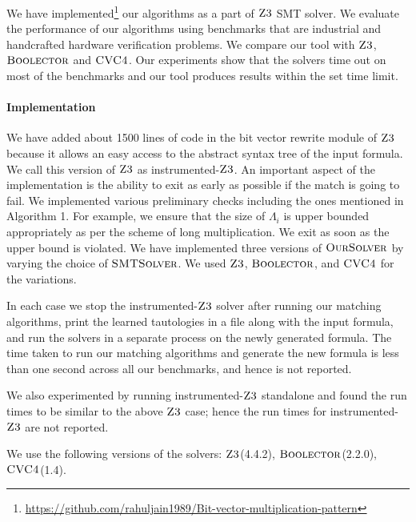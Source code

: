 %
We have implemented\footnote{\url{https://github.com/rahuljain1989/Bit-vector-multiplication-pattern}} our algorithms as a part of $\textsc{Z3}$ SMT solver.
%
 We evaluate the performance of our algorithms using benchmarks that are industrial and handcrafted hardware verification problems.
%
We compare our tool with $\textsc{Z3}$, $\textsc{Boolector}$ and $\textsc{CVC4}$.
%
Our experiments show that the solvers time out on most of the benchmarks and our tool produces results within the set time limit.

\paragraph{\bf Implementation}
We have added about 1500 lines of code in the bit vector rewrite module of $\textsc{Z3}$ because it allows an easy access to the abstract syntax tree of the input formula. We call this version of $\textsc{Z3}$ as instrumented-$\textsc{Z3}$.
%
An important aspect of the implementation is the ability to exit as early as possible if the match is going to fail.
%
We implemented various preliminary checks including the ones mentioned in Algorithm 1. For example, we ensure that the size of $\Lambda_i$ is upper bounded appropriately as per the scheme of long multiplication. We exit as soon as the upper bound is violated. 
%
We have implemented three versions of $\textsc{OurSolver}$ by varying the choice of $\textsc{SMTSolver}$.
%
We used  $\textsc{Z3}$, $\textsc{Boolector}$, and $\textsc{CVC4}$ for the variations. 
%

In each case we stop the instrumented-$\textsc{Z3}$ solver after running our matching algorithms,
print the learned tautologies in a file along with the input formula, and
run the solvers in a separate process on the newly generated formula. 
The time taken to run our matching algorithms and generate the new formula is less than one second across all our benchmarks, and hence is not reported. 

We also experimented by running instrumented-$\textsc{Z3}$ standalone and found the run times to be similar to the above $\textsc{Z3}$ case; hence the run times for instrumented-$\textsc{Z3}$ are not reported. 

We use the following versions of the solvers: $\textsc{Z3}$(4.4.2), $\textsc{Boolector}$(2.2.0), $\textsc{CVC4}$(1.4).

